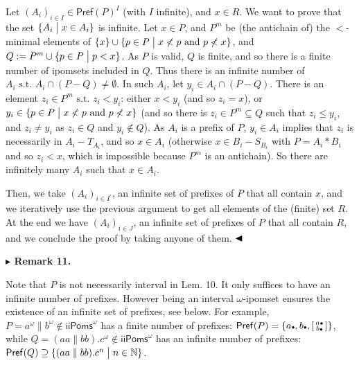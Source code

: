 \documentclass[10pt,a4paper]{article}
\begin{document}
 
Let $(A_{i})_{i\in I}\in\mathsf{Pref}(P)^{I}$ (with $I$ infinite), and $x\in R$. We want to prove that the set ${\{A_{i}\mathrel{\big{|}}x\in A_{i}\}}$ is infinite. Let $x\in P$, and $P^{m}$ be (the antichain of) the $<$-minimal elements of ${\{x\}}\cup{\{p\in P\mathrel{\big{|}}x\not<p\text{ and }p\not<x\}}$, and $Q:=P^{m}\cup{\{p\in P\mathrel{\big{|}}p<x\}}$. As $P$ is valid, $Q$ is finite, and so there is a finite number of ipomsets included in $Q$. Thus there is an infinite number of $A_{i}\text{ s.t.\ }A_{i}\cap(P-Q)\neq\emptyset$. In such $A_{i}$, let $y_{i}\in A_{i}\cap(P-Q)$. There is an element $z_{i}\in P^{m}\text{ s.t.\ }z_{i}<y_{i}$: either $x<y_{i}$ (and so $z_{i}=x$), or $y_{i}\in{\{p\in P\mathrel{\big{|}}x\not<p\text{ and }p\not<x\}}$ (and so there is $z_{i}\in P^{m}\subseteq Q$ such that $z_{i}\leqslant y_{i}$, and $z_{i}\neq y_{i}$ as $z_{i}\in Q$ and $y_{i}\not\in Q$). As $A_{i}$ is a prefix of $P$, $y_{i}\in A_{i}$ implies that $z_{i}$ is necessarily in $A_{i}-T_{A_{i}}$, and so $x\in A_{i}$ (otherwise $x\in B_{i}-S_{B_{i}}$ with $P=A_{i}*B_{i}$ and so $z_{i}<x$, which is impossible because $P^{m}$ is an antichain). So there are infinitely many $A_{i}$ such that $x\in A_{i}$.\par
 
 
 
Then, we take $(A_{i})_{i\in I^{\prime}}$, an infinite set of prefixes of $P$ that all contain $x$, and we iteratively use the previous argument to get all elements of the (finite) set $R$. At the end we have $(A_{i})_{i\in J}$, an infinite set of prefixes of $P$ that all contain $R$, and we conclude the proof by taking anyone of them. $\hfill\blacktriangleleft$\par
 
 
 
\par\medskip\noindent\textbf{$\blacktriangleright$ Remark 11.}\par
 
 
Note that $P$ is not necessarily interval in Lem. 10. It only suffices to have an infinite number of prefixes. However being an interval $\omega$-ipomset ensures the existence of an infinite set of prefixes, see below. For example, $P=a^{\omega}\parallel b^{\omega}\not\in{\mathsf{iiPoms}^{\omega}}$ has a finite number of prefixes: $\mathsf{Pref}(P)={\{a\vbox{\hbox{\tiny$\bullet$}},b\vbox{\hbox{\tiny$\bullet$}},\left[\begin{smallmatrix}a\vbox{\hbox{\tiny$\bullet$}}\\
b\vbox{\hbox{\tiny$\bullet$}}\end{smallmatrix}\right]\}}$, while $Q=(aa\parallel bb).c^{\omega}\not\in{\mathsf{iiPoms}^{\omega}}$ has an infinite number of prefixes: $\mathsf{Pref}(Q)\supseteq{\{(aa\parallel bb).c^{n}\mathrel{\big{|}}n\in\mathbb{N}\}}$.\par
 
\end{document}
